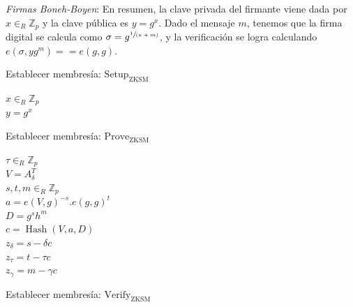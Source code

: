 \emph{Firmas Boneh-Boyen}: En resumen, la clave privada del firmante viene dada por $x \in_{R} \mathbb{Z}_{p}$ y la clave pública es $y = g^{x}$. Dado el mensaje $m$, tenemos que la firma digital se calcula como $\sigma = g^{\sfrac{1}{(x+m)}}$, y la verificación se logra calculando $e(\sigma, yg^{m}) == e(g, g)$.

\begin{minipage}{1\textwidth}
    \begin{algorithm}[H]
        \caption{Establecer membresía: $\operatorname{Setup_{ZKSM}}$}
        $x \in_{R} \mathbb{Z}_{p}$ \\
        $y = g^{x}$ \\
    \end{algorithm}
\end{minipage}

\begin{minipage}{1\textwidth}
    \begin{algorithm}[H]
        \caption{Establecer membresía: $\operatorname{Prove_{ZKSM}}$}
        $\tau \in_{R} \mathbb{Z}_{p}$ \\
        $V = A^{T}_{\delta}$ \\
        $s, t, m \in_{R} \mathbb{Z}_{p}$ \\
        $a = e(V, g)^{-s}.e(g, g)^{t}$ \\
        $D = g^{s}h^{m}$ \\
        $c = \operatorname{Hash}(V, a, D)$ \\
        $z_{\delta} = s - \delta c$ \\
        $z_{\tau} = t - \tau c$ \\
        $z_{\gamma} = m - \gamma c$ \\
    \end{algorithm}
\end{minipage}

\begin{minipage}{1\textwidth}
    \begin{algorithm}[H]
        \caption{Establecer membresía: $\operatorname{Verify_{ZKSM}}$}
    \end{algorithm}
\end{minipage}

